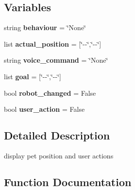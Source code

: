 \subsection*{Variables}
\begin{DoxyCompactItemize}
\item 
\mbox{\label{namespacesimulator_a8070e89f5b5ed9038dfca88d1511d3ee}} 
string {\bfseries behaviour} = \char`\"{}None\char`\"{}
\item 
\mbox{\label{namespacesimulator_ac4279010a27f5018ce8cdab63e86a135}} 
list {\bfseries actual\+\_\+position} = \mbox{[}\char`\"{}-\/-\/\char`\"{},\char`\"{}-\/-\/\char`\"{}\mbox{]}
\item 
\mbox{\label{namespacesimulator_a6e0ff13aace3eeda701c5efa6c5222fd}} 
string {\bfseries voice\+\_\+command} = \char`\"{}None\char`\"{}
\item 
\mbox{\label{namespacesimulator_a79f3cae5bf25b3c6d14382974b58d59c}} 
list {\bfseries goal} = \mbox{[}\char`\"{}-\/-\/\char`\"{},\char`\"{}-\/-\/\char`\"{}\mbox{]}
\item 
\mbox{\label{namespacesimulator_a646adab971b4988a9a64d2b513b9ea34}} 
bool {\bfseries robot\+\_\+changed} = False
\item 
\mbox{\label{namespacesimulator_a0daa027b275daf884aef2e403360ced8}} 
bool {\bfseries user\+\_\+action} = False
\end{DoxyCompactItemize}


\subsection{Detailed Description}
display pet position and user actions 

\subsection{Function Documentation}
\mbox{\label{namespacesimulator_a5265ad4eaba9f8ccb6ff896b006d0f70}} 
